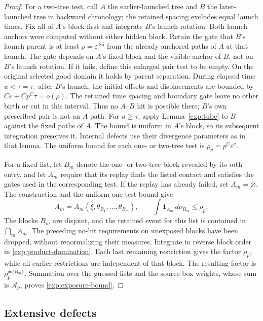 \begin{proof}
For a two-tree test, call $A$ the earlier-launched tree and $B$ the
later-launched tree in backward chronology; the retained spacing excludes
equal launch times.  Fix all of $A$'s block first and integrate $B$'s
launch rotation.  Both launch anchors were computed without either hidden
block.  Retain the gate that $B$'s launch parent is at least
$\rho=\varepsilon^{.85}$ from the already anchored paths of $A$ at that
launch.  The gate depends on $A$'s fixed block and the visible anchor of
$B$, not on $B$'s launch rotation.  If it fails, define this enlarged
pair test to be empty.  On the original selected good domain it holds by
parent separation.  During elapsed time $u<\tau=\tau_\varepsilon$ after
$B$'s launch, the initial offsets and displacements are bounded by
$C\varepsilon+Cp^C\tau=o(\rho)$.  The retained time spacing and boundary gate leave no
other birth or cut in this interval.  Thus no $A$--$B$ hit is possible there;
$B$'s own prescribed pair is not an $A$ path.  For $u\ge\tau$, apply
Lemma~\ref{exp:tube} to $B$ against the fixed paths of $A$.  The bound is
uniform in $A$'s block, so its subsequent integration preserves it.
Internal
defects use their divergence parameters as in that lemma.  The uniform
bound for each one- or two-tree test is
$\rho_p=p^C\varepsilon^c$.

For a fixed list, let $B_m$ denote the one- or two-tree block revealed
by its $m$th entry, and let $A_m$ require that its replay finds the listed
contact and satisfies the gates used in the corresponding test.  If the
replay has already failed, set $A_m=\varnothing$.  The construction and
the uniform one-test bound give
\[
 A_m=A_m(\xi,\theta_{B_1},\ldots,\theta_{B_m}),
 \qquad
 \int \mathbf1_{A_m}\,d\nu_{B_m}\le\rho_p,
\]
The blocks $B_m$ are disjoint, and the retained event for this list is
contained in $\bigcap_m A_m$.  The preceding no-hit requirements on
unexposed blocks have been dropped, without renormalizing their measures.
Integrate in reverse block order in
\eqref{exp:product-domination}.  Each last remaining restriction gives the
factor $\rho_p$, while all earlier restrictions are independent of that
block.  The resulting factor is $\rho_p^{\#\{B_m\}}$.
Summation over the guessed lists and the source-box weights, whose sum is
$\mathcal A_p$, proves
\eqref{exp:exposure-bound}.
\end{proof}

\subsection{Extensive defects}


